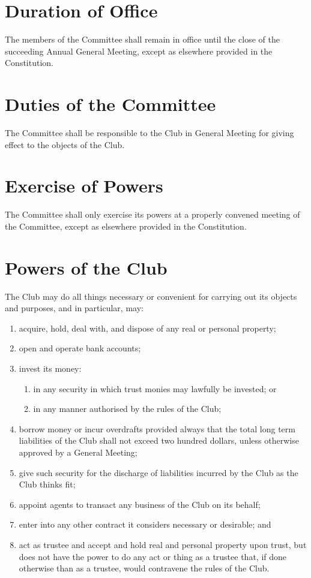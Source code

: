 \documentclass[11pt]{article} %
\begin{document}
\section{Duration of Office}
The members of the Committee shall remain in office until the close of the succeeding Annual General Meeting, except as elsewhere provided in the Constitution.

\section{Duties of the Committee}
The Committee shall be responsible to the Club in General Meeting for giving effect to the objects of the Club.

\section{Exercise of Powers}
The Committee shall only exercise its powers at a properly convened meeting of the Committee, except as elsewhere provided in the Constitution.

\section{Powers of the Club}
The Club may do all things necessary or convenient for carrying out its objects and purposes, and in particular, may:
\begin{enumerate}
	\item acquire, hold, deal with, and dispose of any real or personal property;
	\item open and operate bank accounts;
	\item invest its money:
	\begin{enumerate}[1.]
			\item in any security in which trust monies may lawfully be invested; or
			\item in any manner authorised by the rules of the Club;
		\end{enumerate}
	\item borrow money or incur overdrafts provided always that the total long term liabilities of the Club shall not exceed two hundred dollars, unless otherwise approved by a General Meeting;
	\item give such security for the discharge of liabilities incurred by the Club as the Club thinks fit;
	\item appoint agents to transact any business of the Club on its behalf;
	\item enter into any other contract it considers necessary or desirable; and
	\item act as trustee and accept and hold real and personal property upon trust, but does not have the power to do any act or thing as a trustee that, if done otherwise than as a trustee, would contravene the rules of the Club.
\end{enumerate}
\end{document}
